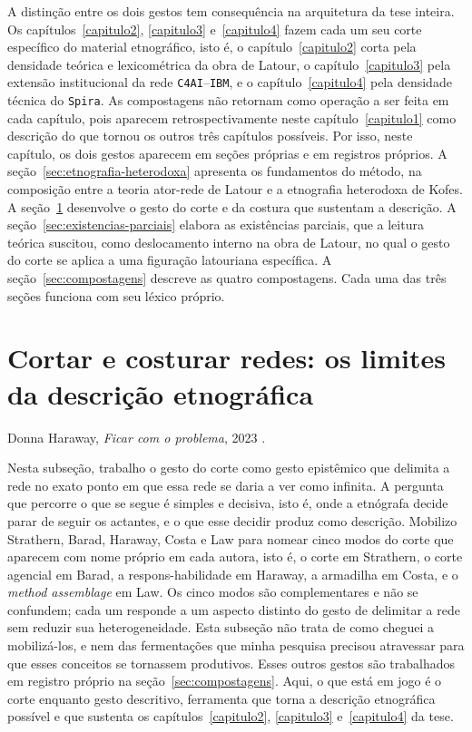A distinção entre os dois gestos tem consequência na arquitetura da tese inteira. Os capítulos~\ref{capitulo2}, \ref{capitulo3} e~\ref{capitulo4} fazem cada um seu corte específico do material etnográfico, isto é, o capítulo~\ref{capitulo2} corta pela densidade teórica e lexicométrica da obra de Latour, o capítulo~\ref{capitulo3} pela extensão institucional da rede \texttt{C4AI}--\texttt{IBM}, e o capítulo~\ref{capitulo4} pela densidade técnica do \texttt{Spira}. As compostagens não retornam como operação a ser feita em cada capítulo, pois aparecem retrospectivamente neste capítulo~\ref{capitulo1} como descrição do que tornou os outros três capítulos possíveis. Por isso, neste capítulo, os dois gestos aparecem em seções próprias e em registros próprios. A seção~\ref{sec:etnografia-heterodoxa} apresenta os fundamentos do método, na composição entre a teoria ator-rede de Latour e a etnografia heterodoxa de Kofes. A seção~\ref{subsec:cortando-redes} desenvolve o gesto do corte e da costura que sustentam a descrição. A seção~\ref{sec:existencias-parciais} elabora as existências parciais, que a leitura teórica suscitou, como deslocamento interno na obra de Latour, no qual o gesto do corte se aplica a uma figuração latouriana específica. A seção~\ref{sec:compostagens} descreve as quatro compostagens. Cada uma das três seções funciona com seu léxico próprio.

\section{Cortar e costurar redes: os limites da descrição etnográfica}
\label{subsec:cortando-redes}

%
{Donna Haraway, \textit{Ficar com o problema}, 2023 \parencite[p.~60]{Haraway2023Ficar}.}

Nesta subseção, trabalho o gesto do corte como gesto epistêmico que delimita a rede no exato ponto em que essa rede se daria a ver como infinita. A pergunta que percorre o que se segue é simples e decisiva, isto é, onde a etnógrafa decide parar de seguir os actantes, e o que esse decidir produz como descrição. Mobilizo Strathern, Barad, Haraway, Costa e Law para nomear cinco modos do corte que aparecem com nome próprio em cada autora, isto é, o corte em Strathern, o corte agencial em Barad, a respons-habilidade em Haraway, a armadilha em Costa, e o \textit{method assemblage} em Law. Os cinco modos são complementares e não se confundem; cada um responde a um aspecto distinto do gesto de delimitar a rede sem reduzir sua heterogeneidade. Esta subseção não trata de como cheguei a mobilizá-los, e nem das fermentações que minha pesquisa precisou atravessar para que esses conceitos se tornassem produtivos. Esses outros gestos são trabalhados em registro próprio na seção~\ref{sec:compostagens}. Aqui, o que está em jogo é o corte enquanto gesto descritivo, ferramenta que torna a descrição etnográfica possível e que sustenta os capítulos~\ref{capitulo2}, \ref{capitulo3} e~\ref{capitulo4} da tese.

